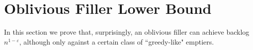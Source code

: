 \section{Oblivious Filler Lower Bound}\label{sec:oblivious}
In this section we prove that, surprisingly, an oblivious filler
can achieve backlog $n^{1-\varepsilon}$, although only against a
certain class of ``greedy-like" emptiers.



